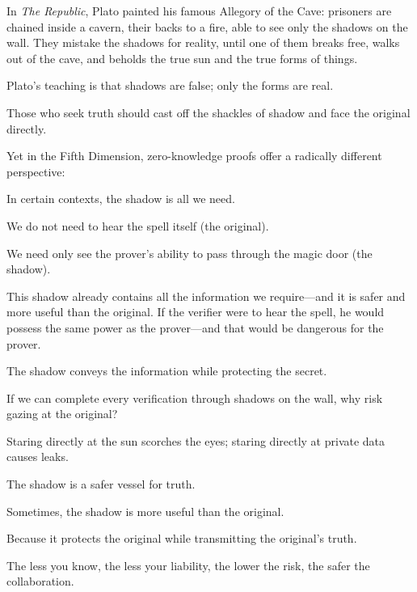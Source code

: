 In \textit{The Republic}, Plato painted his famous Allegory of the Cave: prisoners are chained inside a cavern, their backs to a fire, able to see only the shadows on the wall. They mistake the shadows for reality, until one of them breaks free, walks out of the cave, and beholds the true sun and the true forms of things.

\vspace{1em}

Plato's teaching is that shadows are false; only the forms are real.

Those who seek truth should cast off the shackles of shadow and face the original directly.

\vspace{1em}

Yet in the Fifth Dimension, zero-knowledge proofs offer a radically different perspective:

In certain contexts, the shadow is all we need.

We do not need to hear the spell itself (the original).

We need only see the prover's ability to pass through the magic door (the shadow).

\vspace{1em}

This shadow already contains all the information we require---and it is safer and more useful than the original.
If the verifier were to hear the spell, he would possess the same power as the prover---and that would be dangerous for the prover.

\vspace{1em}

The shadow conveys the information while protecting the secret.

If we can complete every verification through shadows on the wall, why risk gazing at the original?

Staring directly at the sun scorches the eyes; staring directly at private data causes leaks.

\vspace{1em}

The shadow is a safer vessel for truth.

Sometimes, the shadow is more useful than the original.

Because it protects the original while transmitting the original's truth.

\begin{importantbox}
   The less you know, the less your liability, the lower the risk, the safer the collaboration.
\end{importantbox}

